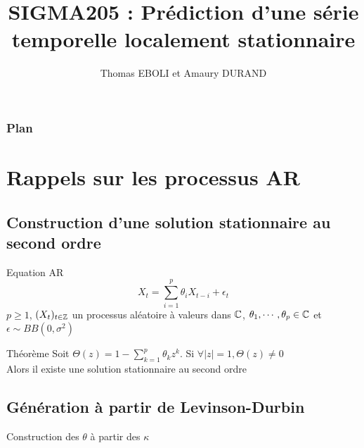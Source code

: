 \documentclass[11pt]{beamer}
\author{Thomas EBOLI et Amaury DURAND}
\title[SIGMA205]{SIGMA205 : Prédiction d'une série temporelle localement stationnaire}
\institute{Télécom ParisTech}
\begin{document}
\begin{frame}
\titlepage
\end{frame}

\begin{frame}
\frametitle{Plan}
\tableofcontents
\end{frame}

\section{Rappels sur les processus AR}
\subsection{Construction d'une solution stationnaire au second ordre}
\begin{frame}
\begin{block}{Equation AR}
\begin{equation}\label{eq:AR}
X_t = \sum_{i=1}^p \theta_i X_{t-i} + \epsilon_t
\tag{AR}
\end{equation}
$p\geq 1$, $(X_t)_{t\in \mathbb{Z}}$ un processus aléatoire à valeurs dans $\mathbb{C}$, $\theta_1,\cdots,\theta_p \in \mathbb{C}$ et $\epsilon \sim BB(0,\sigma^2)$
\end{block}

\begin{alertblock}{Théorème}
Soit $\Theta(z)=1-\sum_{k=1}^p \theta_k z^k$. Si $\forall |z|=1, \Theta(z)\neq 0$ \\
Alors il existe une solution stationnaire au second ordre
\end{alertblock}
\end{frame}

\subsection{Génération à partir de Levinson-Durbin}
\begin{frame}
\begin{algorithm}[H]
 \caption{Construction des $\theta$ à partir  des $\kappa$}
 \label{algo:construction}
\end{algorithm}
\end{frame}
\end{document}
